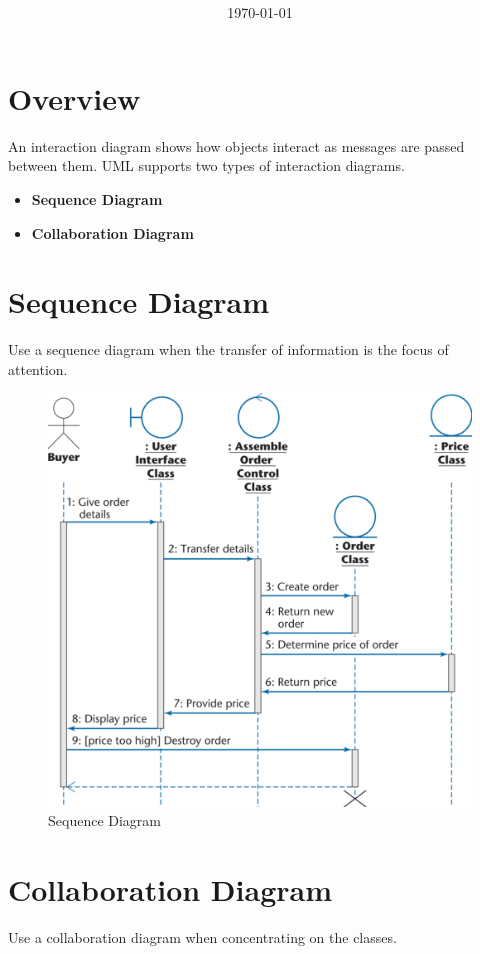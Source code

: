 \documentclass[11pt]{article}
\title{\textbf{\Topic}}
\author{\Name}
\date{\today}
\begin{document}
\maketitle
\noindent\makebox[\linewidth]{\rule[8pt]{5in}{0.5pt}}



\section*{Overview}

An interaction diagram shows how objects interact as messages are passed between them. UML supports two types of interaction diagrams.

\begin{itemize}
	\item \textbf{Sequence Diagram}
	\item \textbf{Collaboration Diagram}
\end{itemize}

\section*{Sequence Diagram}

Use a sequence diagram when the transfer of information is the focus of attention.

\begin{figure}[h]
	\centering
	\includegraphics[width=0.6\linewidth]{images/SequenceDiagram.png}
	\caption{Sequence Diagram}
	\label{fig:SequenceDiagram}
\end{figure}

\section*{Collaboration Diagram}

Use a collaboration diagram when concentrating on the classes.
\end{document}
